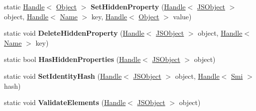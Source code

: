 \begin{DoxyCompactItemize}
\item 
\hypertarget{classv8_1_1internal_1_1_j_s_object_aa969ad8798053028b8f9fc62894ef0cc}{}static \hyperlink{classv8_1_1internal_1_1_handle}{Handle}$<$ \hyperlink{classv8_1_1internal_1_1_object}{Object} $>$ {\bfseries Set\+Hidden\+Property} (\hyperlink{classv8_1_1internal_1_1_handle}{Handle}$<$ \hyperlink{classv8_1_1internal_1_1_j_s_object}{J\+S\+Object} $>$ object, \hyperlink{classv8_1_1internal_1_1_handle}{Handle}$<$ \hyperlink{classv8_1_1internal_1_1_name}{Name} $>$ key, \hyperlink{classv8_1_1internal_1_1_handle}{Handle}$<$ \hyperlink{classv8_1_1internal_1_1_object}{Object} $>$ value)\label{classv8_1_1internal_1_1_j_s_object_aa969ad8798053028b8f9fc62894ef0cc}

\item 
\hypertarget{classv8_1_1internal_1_1_j_s_object_a2506f49a77a94e4561862b5c8f21f175}{}static void {\bfseries Delete\+Hidden\+Property} (\hyperlink{classv8_1_1internal_1_1_handle}{Handle}$<$ \hyperlink{classv8_1_1internal_1_1_j_s_object}{J\+S\+Object} $>$ object, \hyperlink{classv8_1_1internal_1_1_handle}{Handle}$<$ \hyperlink{classv8_1_1internal_1_1_name}{Name} $>$ key)\label{classv8_1_1internal_1_1_j_s_object_a2506f49a77a94e4561862b5c8f21f175}

\item 
\hypertarget{classv8_1_1internal_1_1_j_s_object_ad1eadc64b326b303aca3dd617b9eb06f}{}static bool {\bfseries Has\+Hidden\+Properties} (\hyperlink{classv8_1_1internal_1_1_handle}{Handle}$<$ \hyperlink{classv8_1_1internal_1_1_j_s_object}{J\+S\+Object} $>$ object)\label{classv8_1_1internal_1_1_j_s_object_ad1eadc64b326b303aca3dd617b9eb06f}

\item 
\hypertarget{classv8_1_1internal_1_1_j_s_object_aa3153e3c239a18d6b2aca60d51cca29e}{}static void {\bfseries Set\+Identity\+Hash} (\hyperlink{classv8_1_1internal_1_1_handle}{Handle}$<$ \hyperlink{classv8_1_1internal_1_1_j_s_object}{J\+S\+Object} $>$ object, \hyperlink{classv8_1_1internal_1_1_handle}{Handle}$<$ \hyperlink{classv8_1_1internal_1_1_smi}{Smi} $>$ hash)\label{classv8_1_1internal_1_1_j_s_object_aa3153e3c239a18d6b2aca60d51cca29e}

\item 
\hypertarget{classv8_1_1internal_1_1_j_s_object_abdb09e647ccb020a4e75eda86d7c1893}{}static void {\bfseries Validate\+Elements} (\hyperlink{classv8_1_1internal_1_1_handle}{Handle}$<$ \hyperlink{classv8_1_1internal_1_1_j_s_object}{J\+S\+Object} $>$ object)\label{classv8_1_1internal_1_1_j_s_object_abdb09e647ccb020a4e75eda86d7c1893}


\end{DoxyCompactItemize}
